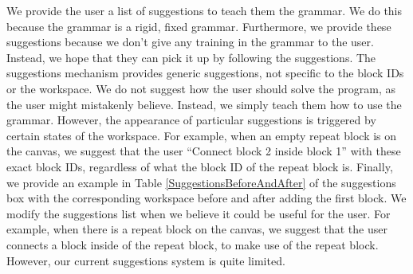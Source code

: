 \documentclass[]{article}
\begin{document}



We provide the user a list of suggestions to teach them the grammar. We do this because the grammar is a rigid, fixed grammar. Furthermore, we provide these suggestions because we don't give any training in the grammar to the user. Instead, we hope that they can pick it up by following the suggestions. The suggestions mechanism provides generic suggestions, not specific to the block IDs or the workspace. We do not suggest how the user should solve the program, as the user might mistakenly believe. Instead, we simply teach them how to use the grammar. However, the appearance of particular suggestions is triggered by certain states of the workspace. For example, when an empty repeat block is on the canvas, we suggest that the user ``Connect block 2 inside block 1'' with these exact block IDs, regardless of what the block ID of the repeat block is. Finally, we provide an example in Table \ref{SuggestionsBeforeAndAfter} of the suggestions box with the corresponding workspace before and after adding the first block. We modify the suggestions list when we believe it could be useful for the user. For example, when there is a repeat block on the canvas, we suggest that the user connects a block inside of the repeat block, to make use of the repeat block. However, our current suggestions system is quite limited.\\
\end{document}
